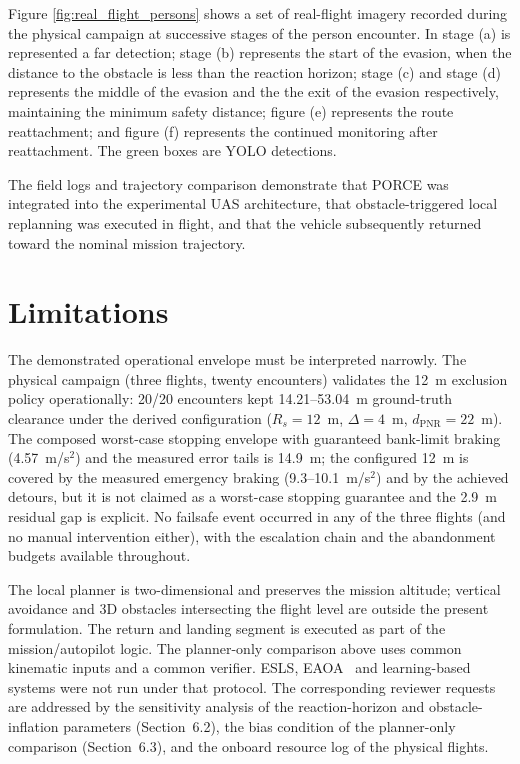 \documentclass[electronics,article,submit,moreauthors]{Definitions/mdpi}
\DeclareRobustCommand{\deleted}[1]{}%
\DeclareRobustCommand{\added}[1]{#1}%
\DeclareRobustCommand{\deleted}[1]{\textcolor{black}{\sout{#1}}}
\DeclareRobustCommand{\added}[1]{\textcolor{green!50!black}{#1}}
\def\deleted#1{}%
\def\added#1{#1}%
\begin{document}
\added{Figure \ref{fig:real_flight_persons} shows a set of real-flight imagery recorded during the physical campaign at successive stages of the person encounter. In stage (a) is represented a far detection; stage (b) represents the start of the evasion, when the distance to the obstacle is less than the reaction horizon; stage (c) and stage (d) represents the middle of the evasion and the the exit of the evasion respectively, maintaining the minimum safety distance; figure (e) represents the route reattachment; and figure (f) represents the continued monitoring after reattachment. The green boxes are YOLO detections. }

\deleted{After these evaluations of the logs, it can be concluded}\added{The field logs and trajectory comparison demonstrate that PORCE was integrated into the experimental UAS architecture, that obstacle-triggered local replanning was executed in flight, and} that the \deleted{system also works in a real world scenario mounted in an UAS architecture.}\added{vehicle subsequently returned toward the nominal mission trajectory.} 


\section{\added{Limitations}}

\added{The demonstrated operational envelope must be interpreted narrowly. The physical campaign (three flights, twenty encounters) validates the 12~m exclusion policy operationally: 20/20 encounters kept 14.21--53.04~m ground-truth clearance under the derived configuration ($R_s=12$~m, $\Delta=4$~m, $d_{\mathrm{PNR}}=22$~m). The composed worst-case stopping envelope with guaranteed bank-limit braking (4.57~m/s$^2$) and the measured error tails is 14.9~m; the configured 12~m is covered by the measured emergency braking (9.3--10.1~m/s$^2$) and by the achieved detours, but it is not claimed as a worst-case stopping guarantee and the 2.9~m residual gap is explicit. No failsafe event occurred in any of the three flights (and no manual intervention either), with the escalation chain and the abandonment budgets available throughout.}


\added{The local planner is two-dimensional and preserves the mission altitude; vertical avoidance and 3D obstacles intersecting the flight level are outside the present formulation. The return and landing segment is executed as part of the mission/autopilot logic. The planner-only comparison above uses common kinematic inputs and a common verifier. ESLS, EAOA~\cite{ghaddar2020eaao} and learning-based systems were not run under that protocol. The corresponding reviewer requests are addressed by the sensitivity analysis of the reaction-horizon and obstacle-inflation parameters (Section~6.2), the bias condition of the planner-only comparison (Section~6.3), and the onboard resource log of the physical flights.}
\end{document}

